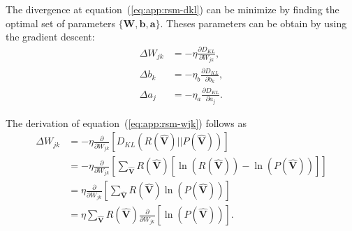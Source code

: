 The divergence at equation~(\ref{eq:app:rsm-dkl}) can be minimize by finding the optimal set of parameters $\{\mathbf{W}, \mathbf{b}, \mathbf{a}\}$. Theses parameters can be obtain by using the gradient descent:
\begin{align}
    \label{eq:app:rsm-wjk}
    \Delta W_{jk} &= -\eta \frac{\partial D_{KL}}{\partial W_{jk}}, \\ %
    \label{eq:app:rsm-bk}
    \Delta b_{k} &= -\eta_{b} \frac{\partial D_{KL}}{\partial b_{k}}, \\ %
    \label{eq:app:rsm-aj}
    \Delta a_{j} &= -\eta_{a} \frac{\partial D_{KL}}{\partial a_{j}}.
\end{align}

The derivation of equation~(\ref{eq:app:rsm-wjk}) follows as
\begin{align}
    \Delta W_{jk} &= -\eta \frac{\partial }{\partial W_{jk}} \left[ D_{KL}(R(\mathbf{\hat{V}}) || P(\mathbf{\hat{V}})) \right] \nonumber \\ %
    &= -\eta \frac{\partial}{\partial W_{jk}} \left[ \sum_{\mathbf{\hat{V}}} R(\mathbf{\hat{V}}) \left[ \ln\left(R(\mathbf{\hat{V}})\right) - \ln\left(P(\mathbf{\hat{V}})\right) \right] \right] \nonumber \\ %
    &= \eta \frac{\partial}{\partial W_{jk}} \left[ \sum_{\mathbf{\hat{V}}} R(\mathbf{\hat{V}}) \ln\left(P(\mathbf{\hat{V}})\right) \right] \nonumber \\ %
    \label{eq:app:rsm-wjk-step1}
    &= \eta \sum_{\mathbf{\hat{V}}} R(\mathbf{\hat{V}}) \frac{\partial}{\partial W_{jk}} \left[ \ln\left(P(\mathbf{\hat{V}})\right) \right]. %
\end{align}

